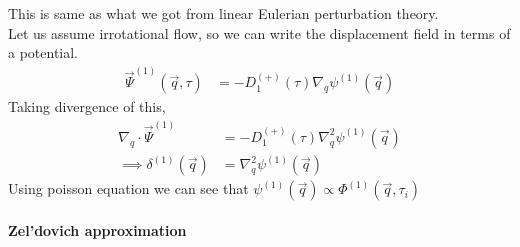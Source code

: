 \documentclass[12pt]{article}
\begin{document}
This is same as what we got from linear Eulerian perturbation theory. \\
Let us assume irrotational flow, so we can write the displacement field in terms of a potential.
\begin{align}
\vec{\Psi}^{(1)} (\vec{q}, \tau) &= - D_1^{(+)}(\tau) \nabla_{q} \psi^{(1)} (\vec{q})
\end{align}
Taking divergence of this, 
\begin{align}
\nabla_{q} \cdot \vec{\Psi}^{(1)} &= - D_1^{(+)}(\tau) \nabla_{q}^2 \psi^{(1)} (\vec{q})\\
\implies \delta^{(1)} (\vec{q}) &= \nabla_{q}^2 \psi^{(1)} (\vec{q})
\end{align}
Using poisson equation we can see that $\psi^{(1)} (\vec{q}) \propto \Phi^{(1)} (\vec{q},\tau_i)$

\paragraph{Zel'dovich approximation}
~\hfill
\end{document}
